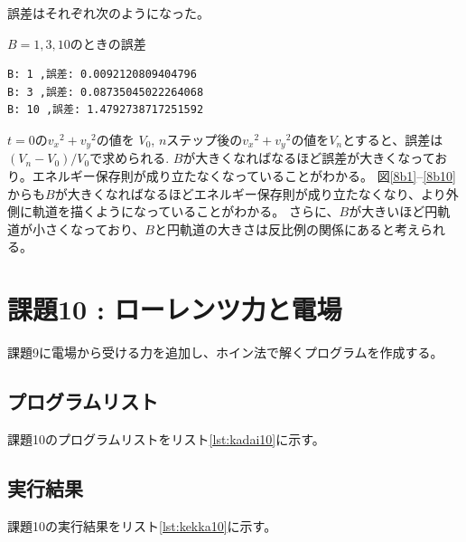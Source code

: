 \documentclass[a4j,titlepage]{jsarticle}
\begin{document}
誤差はそれぞれ次のようになった。

\begin{breakitembox}[l]{$B=1,3,10$のときの誤差}
    \begin{verbatim}
B: 1 ,誤差: 0.0092120809404796
B: 3 ,誤差: 0.08735045022264068
B: 10 ,誤差: 1.4792738717251592
 \end{verbatim}
\end{breakitembox}

$t=0の{v_x}^2+{v_y}^2$の値を $V_0$, $n$ステップ後の${v_x}^2+{v_y}^2$の値を$V_n$とすると、誤差は$(V_n - V_0)/V_0$で求められる.
$B$が大きくなればなるほど誤差が大きくなっており。エネルギー保存則が成り立たなくなっていることがわかる。
図\ref{8b1}--\ref{8b10}からも$B$が大きくなればなるほどエネルギー保存則が成り立たなくなり、より外側に軌道を描くようになっていることがわかる。
さらに、$B$が大きいほど円軌道が小さくなっており、$B$と円軌道の大きさは反比例の関係にあると考えられる。


\section{課題10 : ローレンツ力と電場}
課題9に電場から受ける力を追加し、ホイン法で解くプログラムを作成する。

\subsection{プログラムリスト}
課題10のプログラムリストをリスト\ref{lst:kadai10}に示す。



\subsection{実行結果}
課題10の実行結果をリスト\ref{lst:kekka10}に示す。
\end{document}

